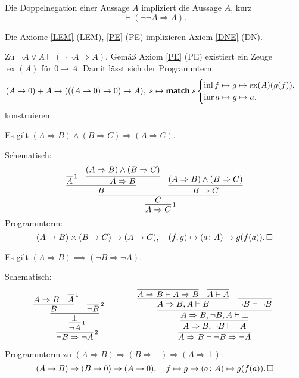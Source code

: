 \begin{Axiom}\label{DNE}\newlinefirst
Die Doppelnegation einer Aussage $A$ impliziert die Aussage $A$, kurz
\[\vdash (\neg\neg A\Rightarrow A).\]
\end{Axiom}

\begin{Satz} Die Axiome \ref{LEM} (LEM), \ref{PE} (PE)
implizieren Axiom \ref{DNE} (DN).
\end{Satz}
\begin{Beweis}
Zu $\neg A \lor A\vdash (\neg\neg A \Rightarrow A)$.
Gemäß Axiom \ref{PE} (PE) existiert ein Zeuge $\operatorname{ex}(A)$
für $0\to A$. Damit lässt sich der Programmterm
\[(A\to 0) + A \to (((A\to 0)\to 0)\to A),\;
s\mapsto\text{{\normalfont\sffamily\bfseries match}}\; s\begin{cases}
\operatorname{inl} f\mapsto g\mapsto \operatorname{ex}(A)(g(f)),\\
\operatorname{inr} a\mapsto g\mapsto a.
\end{cases}\]
konstruieren.\;\qedsymbol
\end{Beweis}

\newpage

\begin{Satz}\newlinefirst
Es gilt
$(A\Rightarrow B) \land (B\Rightarrow C) \Rightarrow (A\Rightarrow C)$.
\end{Satz}
\begin{Beweis}
Schematisch:
\[\infer[\infernote{1}]{A\Rightarrow C}{
  \infer{C}{
   \infer{B}{\infer[\infernote{1}]{A}{}
   & \infer{A\Rightarrow B}{(A\Rightarrow B)\land (B\Rightarrow C)}}
   & \infer{B\Rightarrow C}{(A\Rightarrow B)\land (B\Rightarrow C)}}
}
\]
Programmterm:
\[(A\to B)\times (B\to C)\to (A\to C),\quad
(f, g)\mapsto (a\colon A)\mapsto g(f(a)).\,\square\]
\end{Beweis}

\begin{Satz}[Kontrapositionsableitung]\label{contrapos-intro}\newlinefirst
Es gilt $(A\Rightarrow B)\implies (\neg B\Rightarrow\neg A)$.
\end{Satz}
\begin{Beweis} Schematisch:
\[
\begin{array}{@{}l@{\qquad\qquad}l}
\infer[\infernote{2}]{\neg B\Rightarrow\neg A}{
  \infer[\infernote{1}]{\neg A}{
    \infer{\bot}{
       \infer{B}{A\Rightarrow B & \infer[\infernote{1}]{A}{}}
       & \infer[\infernote{2}]{\neg B}{}
    }
  }
}
&
\infer{A\Rightarrow B\vdash \neg B\Rightarrow\neg A}{
  \infer{A\Rightarrow B, \neg B\vdash\neg A}{
    \infer{A\Rightarrow B, \neg B, A\vdash\bot}{
      \infer{A\Rightarrow B, A\vdash B}{
        \infer{A\Rightarrow B\vdash A\Rightarrow B}{}
        & \infer{A\vdash A}{}}
      & \infer{\neg B\vdash\neg B}{}
    }
  }
}
\end{array}
\]
Programmterm zu $(A\Rightarrow B)\Rightarrow (B\Rightarrow\bot)\Rightarrow (A\Rightarrow\bot)$:
\[(A\to B)\to (B\to 0)\to (A\to 0),\quad
f\mapsto g\mapsto (a\colon A)\mapsto g(f(a)).\,\square\]
\end{Beweis}

